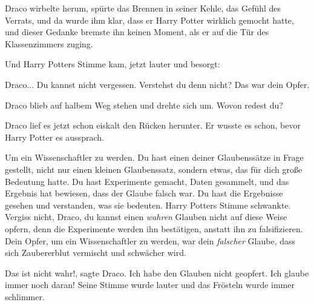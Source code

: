 Draco wirbelte herum, spürte das Brennen in seiner Kehle, das Gefühl des
Verrats, und da wurde ihm klar, dass er Harry Potter wirklich gemocht hatte, und
dieser Gedanke bremste ihn keinen Moment, als er auf die Tür des Klassenzimmers
zuging.

Und Harry Potters Stimme kam, jetzt lauter und besorgt:

\glqq Draco... Du kannst nicht vergessen. Verstehst du denn nicht? Das war dein
Opfer.\grqq{}

Draco blieb auf halbem Weg stehen und drehte sich um. \glqq Wovon redest
du?\grqq{}

Draco lief es jetzt schon eiskalt den Rücken herunter. Er wusste es schon, bevor
Harry Potter es aussprach.

\glqq Um ein Wissenschaftler zu werden. Du hast einen deiner Glaubenssätze in
Frage gestellt, nicht nur einen kleinen Glaubenssatz, sondern etwas, das für
dich große Bedeutung hatte. Du hast Experimente gemacht, Daten gesammelt, und
das Ergebnis hat bewiesen, dass der Glaube falsch war. Du hast die Ergebnisse
gesehen und verstanden, was sie bedeuten.\grqq{} Harry Potters Stimme schwankte.
\glqq Vergiss nicht, Draco, du kannst einen \emph{wahren} Glauben nicht auf
diese Weise opfern, denn die Experimente werden ihn bestätigen, anstatt ihn zu
falsifizieren. Dein Opfer, um ein Wissenschaftler zu werden, war dein
\emph{falscher} Glaube, dass sich Zaubererblut vermischt und schwächer
wird.\grqq{}

\glqq Das ist nicht wahr!\grqq{}, sagte Draco. \glqq Ich habe den Glauben nicht
geopfert. Ich glaube immer noch daran!\grqq{} Seine Stimme wurde lauter und das
Frösteln wurde immer schlimmer.

